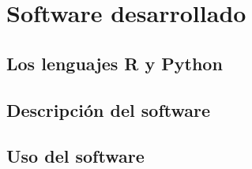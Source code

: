 \chapter{Software desarrollado}

\section{Los lenguajes R y Python}

\section{Descripción del software}

\section{Uso del software}
